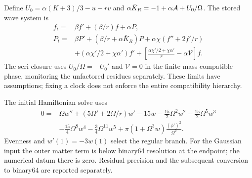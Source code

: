 Define $U_0=\alpha(K+3)/3-u-rv$ and $\alpha\bar K_R=-1+\alpha\mathcal A+U_0/\Omega$. The stored wave system is
\begin{align}
 f_t={}&\beta f'+(\beta/r)f+\alpha P,\\
 P_t={}&\beta P'+(\beta/r+\alpha\bar K_R)P
 +\alpha\chi(f''+2f'/r)\nonumber\\
 &+(\alpha\chi'/2+\chi\alpha')f'
 +\left[\frac{\alpha\chi'/2+\chi\alpha'}r-\alpha\mathcal V\right]f.
\end{align}
The scri closure uses $U_0/\Omega=-U_0'$ and $\mathcal V=0$ in the finite-mass compatible phase, monitoring the unfactored residues separately. These limits have assumptions; fixing a clock does not enforce the entire compatibility hierarchy.

The initial Hamiltonian solve uses
\begin{align}
0={}&\Omega w''+(5\Omega'+2\Omega/r)w'-15w
 -\tfrac{15}{2}\Omega^2w^2-\tfrac{15}{2}\Omega^5w^3\nonumber\\
 &-\tfrac{15}{4}\Omega^8w^4-\tfrac34\Omega^{11}w^5
 +\pi(1+\Omega^3w)\frac{(\phi')^2}{\Omega^2}.
\end{align}
Evenness and $w'(1)=-3w(1)$ select the regular branch. For the Gaussian input the outer matter term is below binary64 resolution at the endpoint; the numerical datum there is zero. Residual precision and the subsequent conversion to binary64 are reported separately.

